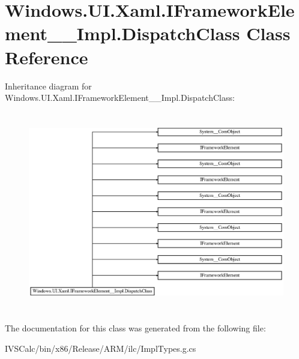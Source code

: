 \hypertarget{class_windows_1_1_u_i_1_1_xaml_1_1_i_framework_element_____impl_1_1_dispatch_class}{}\section{Windows.\+U\+I.\+Xaml.\+I\+Framework\+Element\+\_\+\+\_\+\+Impl.\+Dispatch\+Class Class Reference}
\label{class_windows_1_1_u_i_1_1_xaml_1_1_i_framework_element_____impl_1_1_dispatch_class}
Inheritance diagram for Windows.\+U\+I.\+Xaml.\+I\+Framework\+Element\+\_\+\+\_\+\+Impl.\+Dispatch\+Class\+:\begin{figure}[H]
\begin{center}
\leavevmode
\includegraphics[height=8.774929cm]{class_windows_1_1_u_i_1_1_xaml_1_1_i_framework_element_____impl_1_1_dispatch_class}
\end{center}
\end{figure}


The documentation for this class was generated from the following file\+:\begin{DoxyCompactItemize}
\item 
I\+V\+S\+Calc/bin/x86/\+Release/\+A\+R\+M/ilc/Impl\+Types.\+g.\+cs\end{DoxyCompactItemize}
